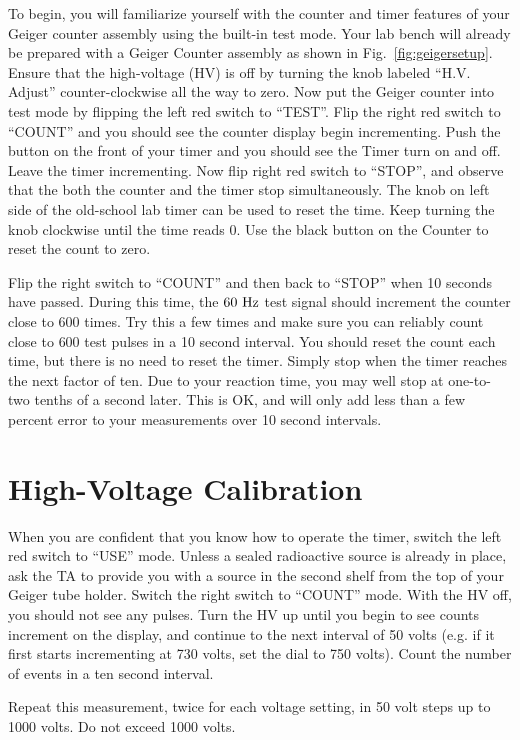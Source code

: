 To begin, you will familiarize yourself with the counter and timer
features of your Geiger counter assembly using the built-in test mode.
Your lab bench will already be prepared with a Geiger Counter assembly
as shown in Fig.~\ref{fig:geigersetup}.  Ensure that the high-voltage
(HV) is off by turning the knob labeled ``H.V. Adjust''
counter-clockwise all the way to zero.  Now put the Geiger counter
into test mode by flipping the left red switch to ``TEST''.  Flip the
right red switch to ``COUNT'' and you should see the counter display
begin incrementing.  Push the button on the front of your timer and
you should see the Timer turn on and off.  Leave the timer
incrementing.  Now flip right red switch to ``STOP'', and observe that
the both the counter and the timer stop simultaneously.  The knob on
left side of the old-school lab timer can be used to reset the time.
Keep turning the knob clockwise until the time reads 0.  Use the black
button on the Counter to reset the count to zero.

Flip the right switch to ``COUNT'' and then back to ``STOP'' when 10
seconds have passed.  During this time, the $60~\rm Hz$ test signal
should increment the counter close to 600 times.  Try this a few times
and make sure you can reliably count close to $600$ test pulses in a
10 second interval.  You should reset the count each time, but there
is no need to reset the timer.  Simply stop when the timer reaches the
next factor of ten.  Due to your reaction time, you may well stop at
one-to-two tenths of a second later.  This is OK, and will only add
less than a few percent error to your measurements over 10 second
intervals.

\section{High-Voltage Calibration}

When you are confident that you know how to operate the timer, switch
the left red switch to ``USE'' mode.  Unless a sealed radioactive source is already in place, ask the TA to provide you with a source in the second shelf from the top of your Geiger tube holder.  Switch the right switch to ``COUNT'' mode.  With
the HV off, you should not see any pulses.  Turn the HV up until you
begin to see counts increment on the display, and continue to the next
interval of 50 volts (e.g. if it first starts incrementing at 730
volts, set the dial to 750 volts).  Count the number of events in a
ten second interval.

Repeat this measurement, twice for each voltage setting, in 50 volt
steps up to 1000 volts.  Do not exceed 1000 volts.

